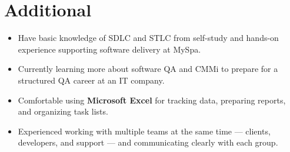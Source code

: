 \documentclass[a4paper,11pt]{article}
\newcommand{\resumeItemListStart}{\begin{itemize}[leftmargin=0.2in, label=\textbullet, itemsep=1pt, parsep=0pt]}
\newcommand{\resumeItemListEnd}{\end{itemize}\vspace{-4pt}}
\newcommand{\resumeItem}[1]{\item\small{#1}}
\begin{document}
\section{Additional}
\resumeItemListStart
  \resumeItem{Have basic knowledge of SDLC and STLC from self-study and hands-on experience supporting software delivery at MySpa.}
  \resumeItem{Currently learning more about software QA and CMMi to prepare for a structured QA career at an IT company.}
  \resumeItem{Comfortable using \textbf{Microsoft Excel} for tracking data, preparing reports, and organizing task lists.}
  \resumeItem{Experienced working with multiple teams at the same time --- clients, developers, and support --- and communicating clearly with each group.}
\resumeItemListEnd
\end{document}
